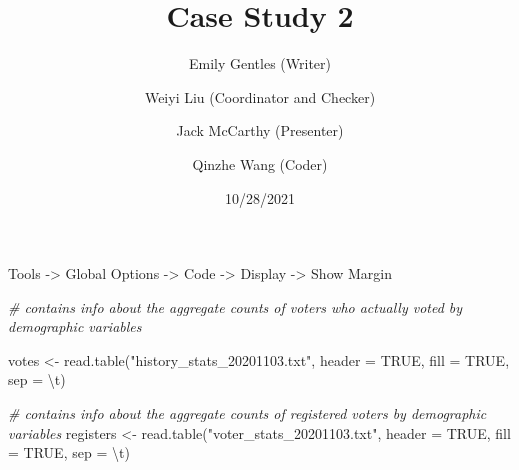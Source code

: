 \documentclass[
]{article}
\title{Case Study 2}
\author{Emily Gentles (Writer) \and Weiyi Liu (Coordinator and
Checker) \and Jack McCarthy (Presenter) \and Qinzhe Wang (Coder)}
\date{10/28/2021}
\newenvironment{Shaded}{\begin{snugshade}}{\end{snugshade}}
\newcommand{\AttributeTok}[1]{\textcolor[rgb]{0.77,0.63,0.00}{#1}}
\newcommand{\CommentTok}[1]{\textcolor[rgb]{0.56,0.35,0.01}{\textit{#1}}}
\newcommand{\ConstantTok}[1]{\textcolor[rgb]{0.00,0.00,0.00}{#1}}
\newcommand{\FunctionTok}[1]{\textcolor[rgb]{0.00,0.00,0.00}{#1}}
\newcommand{\NormalTok}[1]{#1}
\newcommand{\OtherTok}[1]{\textcolor[rgb]{0.56,0.35,0.01}{#1}}
\newcommand{\SpecialCharTok}[1]{\textcolor[rgb]{0.00,0.00,0.00}{#1}}
\newcommand{\StringTok}[1]{\textcolor[rgb]{0.31,0.60,0.02}{#1}}
\begin{document}
\maketitle

Tools -\textgreater{} Global Options -\textgreater{} Code
-\textgreater{} Display -\textgreater{} Show Margin

\begin{Shaded}
\begin{Highlighting}[]
\CommentTok{\# contains info about the aggregate counts of voters who actually voted by demographic variables}

\NormalTok{votes }\OtherTok{\textless{}{-}} \FunctionTok{read.table}\NormalTok{(}\StringTok{"history\_stats\_20201103.txt"}\NormalTok{, }\AttributeTok{header =} \ConstantTok{TRUE}\NormalTok{, }\AttributeTok{fill =} \ConstantTok{TRUE}\NormalTok{, }\AttributeTok{sep =} \StringTok{\textquotesingle{}}\SpecialCharTok{\textbackslash{}t}\StringTok{\textquotesingle{}}\NormalTok{)}

\CommentTok{\# contains info about the aggregate counts of registered voters by demographic variables}
\NormalTok{registers }\OtherTok{\textless{}{-}} \FunctionTok{read.table}\NormalTok{(}\StringTok{"voter\_stats\_20201103.txt"}\NormalTok{, }\AttributeTok{header =} \ConstantTok{TRUE}\NormalTok{, }\AttributeTok{fill =} \ConstantTok{TRUE}\NormalTok{, }\AttributeTok{sep =} \StringTok{\textquotesingle{}}\SpecialCharTok{\textbackslash{}t}\StringTok{\textquotesingle{}}\NormalTok{)}
\end{Highlighting}
\end{Shaded}
\end{document}
